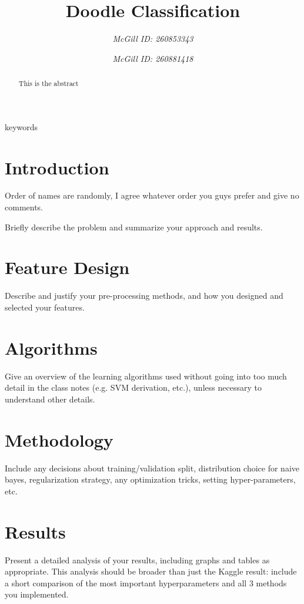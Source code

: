 \documentclass[conference]{IEEEtran}
\begin{document}
\title{Doodle Classification}

\author{
\and
{}
\textit{McGill ID: 260853343} \\
\and
{}
\textit{McGill ID: 260881418} \\
}

\maketitle

\begin{abstract}
This is the abstract
\end{abstract}

\begin{IEEEkeywords}
keywords
\end{IEEEkeywords}

\section{Introduction} 

Order of names are randomly, I agree whatever order you guys prefer and give no comments.

Briefly describe the problem and summarize your approach
and results.~\cite{akl2007dynamic}


\section{Feature Design} 
Describe and justify your pre-processing methods,
and how you designed and selected your features.
\section{ Algorithms}
 Give an overview of the learning algorithms used without
going into too much detail in the class notes (e.g. SVM derivation,
etc.), unless necessary to understand other details.
\section{Methodology}
 Include any decisions about training/validation split,
distribution choice for naive bayes, regularization strategy, any optimization
tricks, setting hyper-parameters, etc.
\section{Results}
 Present a detailed analysis of your results, including graphs
and tables as appropriate. This analysis should be broader than just
the Kaggle result: include a short comparison of the most important
hyperparameters and all 3 methods you implemented.
\end{document}
